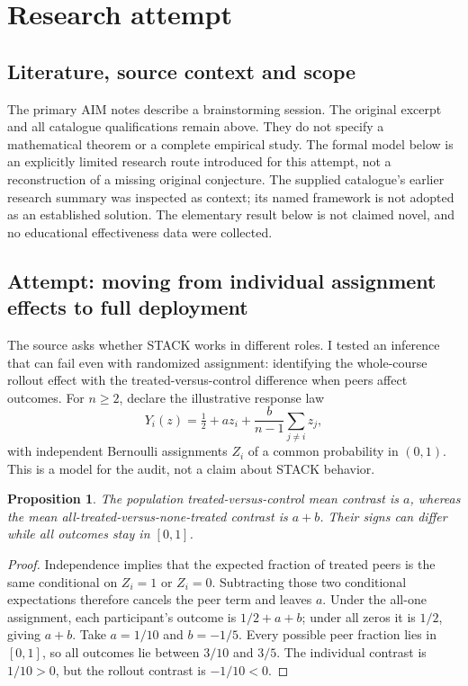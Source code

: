 \documentclass[11pt]{article}
\newtheorem{proposition}{Proposition}
\begin{document}
\section{Research attempt}
\subsection{Literature, source context and scope}
The primary AIM notes describe a brainstorming session. The original excerpt and all catalogue qualifications remain above. They do not specify a mathematical theorem or a complete empirical study. The formal model below is an explicitly limited research route introduced for this attempt, not a reconstruction of a missing original conjecture. The supplied catalogue's earlier research summary was inspected as context; its named framework is not adopted as an established solution. The elementary result below is not claimed novel, and no educational effectiveness data were collected.

\subsection{Attempt: moving from individual assignment effects to full deployment}
The source asks whether STACK works in different roles. I tested an inference that can fail even with randomized assignment: identifying the whole-course rollout effect with the treated-versus-control difference when peers affect outcomes. For $n\ge2$, declare the illustrative response law
\[
Y_i(z)=\tfrac12+a z_i+\frac b{n-1}\sum_{j\ne i}z_j,
\]
with independent Bernoulli assignments $Z_i$ of a common probability in $(0,1)$. This is a model for the audit, not a claim about STACK behavior.
\begin{proposition}
The population treated-versus-control mean contrast is $a$, whereas the mean all-treated-versus-none-treated contrast is $a+b$. Their signs can differ while all outcomes stay in $[0,1]$.
\end{proposition}
\begin{proof}
Independence implies that the expected fraction of treated peers is the same conditional on $Z_i=1$ or $Z_i=0$. Subtracting those two conditional expectations therefore cancels the peer term and leaves $a$. Under the all-one assignment, each participant's outcome is $1/2+a+b$; under all zeros it is $1/2$, giving $a+b$. Take $a=1/10$ and $b=-1/5$. Every possible peer fraction lies in $[0,1]$, so all outcomes lie between $3/10$ and $3/5$. The individual contrast is $1/10>0$, but the rollout contrast is $-1/10<0$.
\end{proof}
\end{document}
